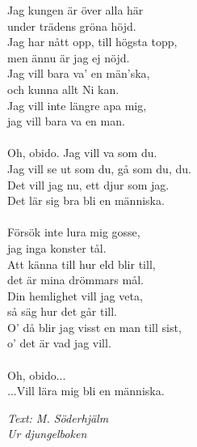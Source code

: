 \vspace{10pt}
Jag kungen är över alla här\\
under trädens gröna höjd.\\
Jag har nått opp, till högsta topp,\\
men ännu är jag ej nöjd.\\
Jag vill bara va' en män'ska,\\
och kunna allt Ni kan.\\
Jag vill inte längre apa mig,\\
jag vill bara va en man.\\
\\
Oh, obido. Jag vill va som du.\\
Jag vill se ut som du, gå som du, du.\\
Det vill jag nu, ett djur som jag.\\
Det lär sig bra bli en människa.\\
\\
Försök inte lura mig gosse,\\
jag inga konster tål.\\
Att känna till hur eld blir till,\\
det är mina drömmars mål.\\
Din hemlighet vill jag veta,\\
så säg hur det går till.\\
O' då blir jag visst en man till sist,\\
o' det är vad jag vill.\\
\\
Oh, obido...\\
...Vill lära mig bli en människa.
\par
\vspace{10pt}
{\footnotesize\textit{Text: M. Söderhjälm\\Ur djungelboken}}
